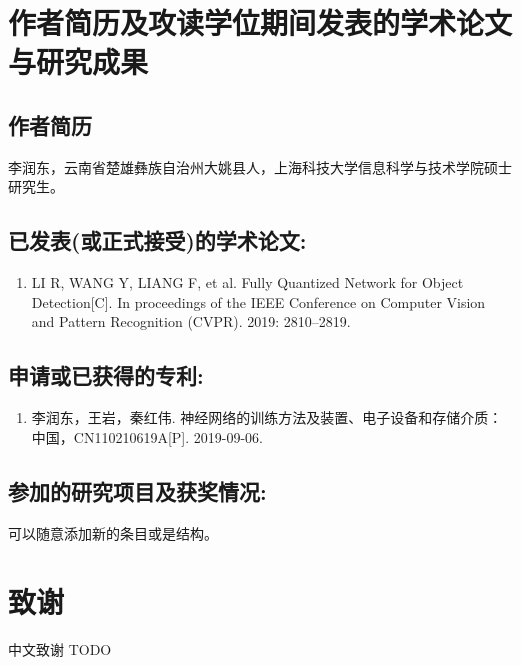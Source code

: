 \chapter{作者简历及攻读学位期间发表的学术论文与研究成果}

\section*{作者简历}
李润东，云南省楚雄彝族自治州大姚县人，上海科技大学信息科学与技术学院硕士研究生。

\section*{已发表(或正式接受)的学术论文:}
{
\setlist[enumerate]{}
\begin{enumerate}[nosep]
    \item LI R, WANG Y, LIANG F, et al. Fully Quantized Network for Object Detection[C]. In proceedings of the IEEE Conference on Computer Vision and Pattern Recognition (CVPR). 2019: 2810--2819.
\end{enumerate}
}

\section*{申请或已获得的专利:}
{
\setlist[enumerate]{}
\begin{enumerate}[nosep]
    \item 李润东，王岩，秦红伟. 神经网络的训练方法及装置、电子设备和存储介质：中国，CN110210619A[P]. 2019-09-06.
\end{enumerate}
}

\section*{参加的研究项目及获奖情况:}

可以随意添加新的条目或是结构。

\chapter[致谢]{致\quad 谢}%
\thispagestyle{noheaderstyle}%
中文致谢 TODO

\cleardoublepage[plain]%
